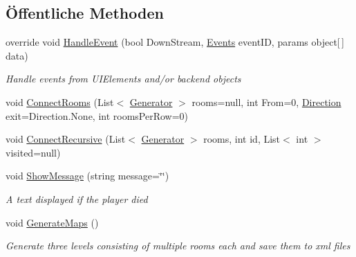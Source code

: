 \subsection*{Öffentliche Methoden}
\begin{DoxyCompactItemize}
\item 
override void \hyperlink{class_gruppe22_1_1_backend_1_1_game_logic_a44491c21e7048676d19f2e4dbfb2386c}{Handle\-Event} (bool Down\-Stream, \hyperlink{namespace_gruppe22_1_1_backend_ab56df91bb0bdafa1ea978e552209ce73}{Events} event\-I\-D, params object\mbox{[}$\,$\mbox{]} data)
\begin{DoxyCompactList}\small\item\em Handle events from U\-I\-Elements and/or backend objects \end{DoxyCompactList}\item 
void \hyperlink{class_gruppe22_1_1_backend_1_1_game_logic_a1be5667d5db7294fad1da32721f195ca}{Connect\-Rooms} (List$<$ \hyperlink{class_gruppe22_1_1_backend_1_1_generator}{Generator} $>$ rooms=null, int From=0, \hyperlink{namespace_gruppe22_1_1_backend_a2d53d5d14b8ea0951ba6971e5da1ebf5}{Direction} exit=Direction.\-None, int rooms\-Per\-Row=0)
\item 
void \hyperlink{class_gruppe22_1_1_backend_1_1_game_logic_a352d3b5b0d7c02cb73938e0464ee941a}{Connect\-Recursive} (List$<$ \hyperlink{class_gruppe22_1_1_backend_1_1_generator}{Generator} $>$ rooms, int id, List$<$ int $>$ visited=null)
\item 
void \hyperlink{class_gruppe22_1_1_backend_1_1_game_logic_aae4a27768f44fa3ee079eeda9f418990}{Show\-Message} (string message=\char`\"{}\char`\"{})
\begin{DoxyCompactList}\small\item\em A text displayed if the player died \end{DoxyCompactList}\item 
void \hyperlink{class_gruppe22_1_1_backend_1_1_game_logic_acaa73fcd270f74efde215829988df8ee}{Generate\-Maps} ()
\begin{DoxyCompactList}\small\item\em Generate three levels consisting of multiple rooms each and save them to xml files \end{DoxyCompactList}\end{DoxyCompactItemize}
